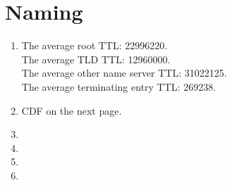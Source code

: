 \documentclass{article}
\begin{document}
\section{Naming}
    \begin{enumerate}
        \item
        The average root TTL: 22996220.\\
        The average TLD TTL: 12960000.\\
        The average other name server TTL: 31022125.\\
        The average terminating entry TTL: 269238.
        \item
        CDF on the next page. 
        \item
        \item
        \item
        \item
    
    \end{enumerate}
\end{document}
